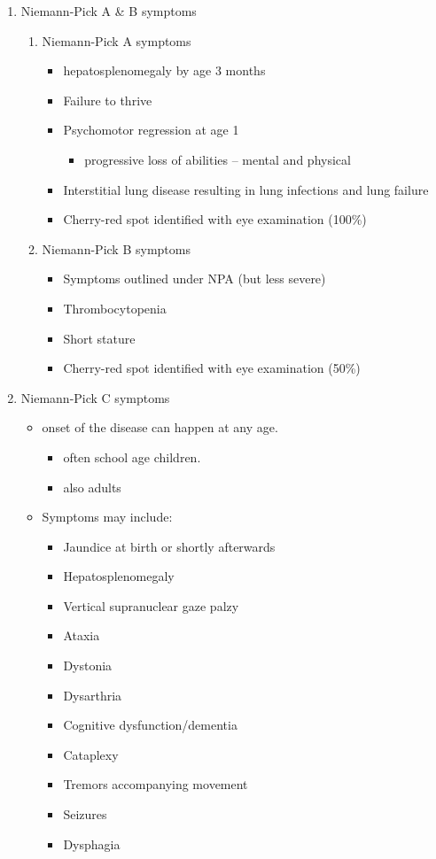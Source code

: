 \documentclass{scrartcl}
\begin{document}
\begin{enumerate}
\item Niemann-Pick A \& B symptoms
\label{sec:orgeb98b13}

\begin{enumerate}
\item Niemann-Pick A symptoms
\label{sec:orgd31c6f8}
\begin{itemize}
\item hepatosplenomegaly by age 3 months
\item Failure to thrive
\item Psychomotor regression at age 1
\begin{itemize}
\item progressive loss of abilities – mental and physical
\end{itemize}
\item Interstitial lung disease resulting in lung infections and lung failure
\item Cherry-red spot identified with eye examination (100\%)
\end{itemize}

\item Niemann-Pick B symptoms
\label{sec:org41dcfd1}
\begin{itemize}
\item Symptoms outlined under NPA (but less severe)
\item Thrombocytopenia
\item Short stature
\item Cherry-red spot identified with eye examination (50\%)
\end{itemize}
\end{enumerate}

\item Niemann-Pick C symptoms
\label{sec:orgbe4facf}

\begin{itemize}
\item onset of the disease can happen at any age.
\begin{itemize}
\item often school age children.
\item also adults
\end{itemize}

\item Symptoms may include:
\begin{itemize}
\item Jaundice at birth or shortly afterwards
\item Hepatosplenomegaly
\item Vertical supranuclear gaze palzy
\item Ataxia
\item Dystonia
\item Dysarthria
\item Cognitive dysfunction/dementia
\item Cataplexy
\item Tremors accompanying movement
\item Seizures
\item Dysphagia
\end{itemize}
\end{itemize}


\end{enumerate}
\end{document}
